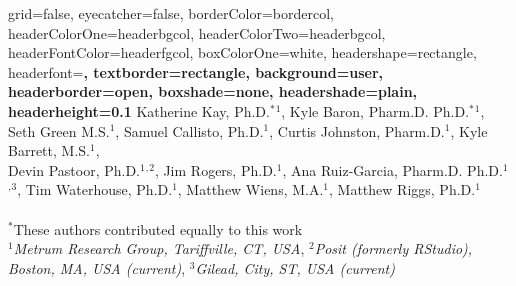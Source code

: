 \documentclass[portrait,fontscale=0.46,paperwidth=36in,paperheight=48in]{baposter}
\begin{document}

\background{
}

\begin{poster}{
	grid=false,
	eyecatcher=false, 
	borderColor=bordercol,
	headerColorOne=headerbgcol,
	headerColorTwo=headerbgcol,
	headerFontColor=headerfgcol,
	boxColorOne=white,
	headershape=rectangle,
	headerfont=\Large\bf\textsf,
	textborder=rectangle,
	background=user,
	headerborder=open,
  boxshade=none, 
  headershade=plain,
  headerheight=0.1\textheight %
}
{
}
{
	\textbf{\textsf{\color{titlefgcol}{
	A Suite of Open-Source Tools to Guide Efficient Pharmacometric Analyses
	 }}}\vspace{.5em}
}
{
	Katherine Kay, Ph.D.$^\ast$$^1$, Kyle Baron, Pharm.D. Ph.D.$^\ast$$^1$, Seth Green M.S.$^1$, 
	Samuel Callisto, Ph.D.$^1$, Curtis Johnston, Pharm.D.$^1$, Kyle Barrett, M.S.$^1$, \\
	Devin Pastoor, Ph.D.$^1$$^,$$^2$, Jim Rogers, Ph.D.$^1$, Ana Ruiz-Garcia, Pharm.D. Ph.D.$^1$$^,$$^3$, 
	Tim Waterhouse, Ph.D.$^1$, Matthew Wiens, M.A.$^1$, Matthew Riggs, Ph.D.$^1$ \\ \\
	{\smaller$^\ast$These authors contributed equally to this work \\
	  $^1$\textit{Metrum Research Group, Tariffville, CT, USA}, $^2$\textit{Posit (formerly RStudio), Boston, MA, USA (current)}, $^3$\textit{Gilead, City, ST, USA (current)}
}}
\end{poster}
\end{document}
